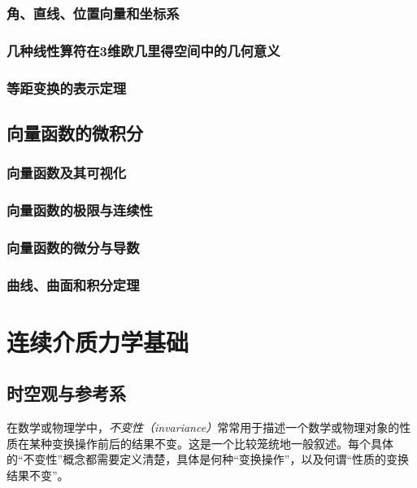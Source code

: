 \documentclass[zihao=-4,linespread=1.5,a4paper,heading=true,twoside]{ctexbook}
\theoremstyle{definition}
\theoremstyle{plain}
\begin{document}
\section{角、直线、位置向量和坐标系}\label{sec:II.3.2}


\section{几种线性算符在3维欧几里得空间中的几何意义}\label{sec:II.3.3}


\section{等距变换的表示定理}\label{sec:II.3.4}




\chapter{向量函数的微积分}\label{sec:II.4}
\section{向量函数及其可视化}\label{sec:II.4.1}


\section{向量函数的极限与连续性}\label{sec:II.4.2}


\section{向量函数的微分与导数}\label{sec:II.4.3}


\section{曲线、曲面和积分定理}\label{sec:II.4.4}


\part{连续介质力学基础}\label{sec:III}
\chapter{时空观与参考系}\label{sec:III.5}
在数学或物理学中，\emph{不变性（invariance）}常常用于描述一个数学或物理对象的性质在某种变换操作前后的结果不变。这是一个比较笼统地一般叙述。每个具体的“不变性”概念都需要定义清楚，具体是何种“变换操作”，以及何谓“性质的变换结果不变”。
\end{document}

